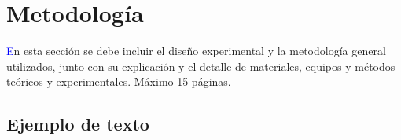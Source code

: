 \chapter{Metodología}
\label{ch:metodo}

{\textcolor{blue} En esta sección se debe incluir el diseño experimental y la metodología 
general utilizados, junto con su explicación y el detalle de materiales, equipos y métodos teóricos
 y experimentales. Máximo 15 páginas.}

\section{Ejemplo de texto}
